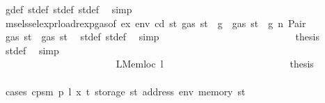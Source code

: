 \begin{isabellebody}
\ g{\isacharunderscore}{\kern0pt}def\ st{\isacharprime}{\kern0pt}{\isacharunderscore}{\kern0pt}def\ st{\isacharprime}{\kern0pt}{\isacharprime}{\kern0pt}{\isacharunderscore}{\kern0pt}def\ st{\isacharprime}{\kern0pt}{\isacharprime}{\kern0pt}{\isacharprime}{\kern0pt}{\isacharunderscore}{\kern0pt}def\ \isamarkupfalse%
\ simp\isanewline
\ \ \ \ \ \ \ \ \ \ \ \ \ \ \ \ \ \ \ \ \ \ \ \ \isamarkupfalse%
\ \isamarkupfalse%
\ msel{\isacharunderscore}{\kern0pt}ssel{\isacharunderscore}{\kern0pt}expr{\isacharunderscore}{\kern0pt}load{\isacharunderscore}{\kern0pt}rexp{\isacharunderscore}{\kern0pt}gas{\isacharparenleft}{\kern0pt}{}{\isacharparenright}{\kern0pt}{\isacharbrackleft}{\kern0pt}of\ ex\ env\ cd\ st{\isacharprime}{\kern0pt}\ {\isachardoublequoteopen}gas\ st\ {\isacharminus}{\kern0pt}\ g{\isachardoublequoteclose}{\isacharbrackright}{\kern0pt}\ {\isacharbackquoteopen}{\isasymnot}\ gas\ st\ {\isasymle}\ g{\isacharbackquoteclose}\ n\ Pair\ \isamarkupfalse%
\ {\isachardoublequoteopen}gas\ st{\isacharprime}{\kern0pt}{\isacharprime}{\kern0pt}\ {\isasymle}\ gas\ st{\isacharprime}{\kern0pt}{\isachardoublequoteclose}\ \isamarkupfalse%
\ st{\isacharprime}{\kern0pt}{\isacharunderscore}{\kern0pt}def\ st{\isacharprime}{\kern0pt}{\isacharprime}{\kern0pt}{\isacharunderscore}{\kern0pt}def\ \isamarkupfalse%
\ simp\isanewline
\ \ \ \ \ \ \ \ \ \ \ \ \ \ \ \ \ \ \ \ \ \ \ \ \isamarkupfalse%
\ \isamarkupfalse%
\ {\isacharquery}{\kern0pt}thesis\ \isamarkupfalse%
\ st{\isacharprime}{\kern0pt}{\isacharunderscore}{\kern0pt}def\ \isamarkupfalse%
\ simp\isanewline
\ \ \ \ \ \ \ \ \ \ \ \ \ \ \ \ \ \ \ \ \ \ \isamarkupfalse%
\isanewline
\ \ \ \ \ \ \ \ \ \ \ \ \ \ \ \ \ \ \ \ \isamarkupfalse%
\isanewline
\ \ \ \ \ \ \ \ \ \ \ \ \ \ \ \ \ \ \ \ \ \ \isamarkupfalse%
\ {\isacharparenleft}{\kern0pt}LMemloc\ l{\isacharparenright}{\kern0pt}\isanewline
\ \ \ \ \ \ \ \ \ \ \ \ \ \ \ \ \ \ \ \ \ \ \isamarkupfalse%
\ \isamarkupfalse%
\ {\isacharquery}{\kern0pt}thesis\isanewline
\ \ \ \ \ \ \ \ \ \ \ \ \ \ \ \ \ \ \ \ \ \ \isamarkupfalse%
\ {\isacharparenleft}{\kern0pt}cases\ {\isachardoublequoteopen}cps{}m\ p\ l\ x\ t\ {\isacharparenleft}{\kern0pt}storage\ st{\isacharprime}{\kern0pt}{\isacharprime}{\kern0pt}\ {\isacharparenleft}{\kern0pt}address\ env{\isacharparenright}{\kern0pt}{\isacharparenright}{\kern0pt}\ {\isacharparenleft}{\kern0pt}memory\ st{\isacharprime}{\kern0pt}{\isacharprime}{\kern0pt}{\isacharparenright}{\kern0pt}{\isachardoublequoteclose}{\isacharparenright}{\kern0pt}\isanewline

\end{isabellebody}
